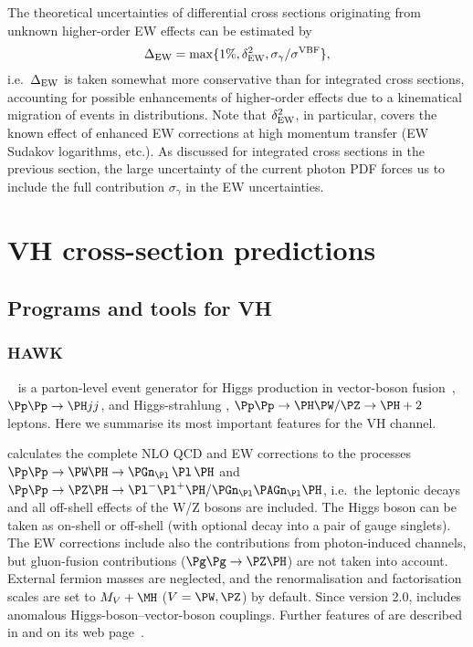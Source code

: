 The theoretical uncertainties of differential cross sections originating from unknown 
higher-order EW effects can be estimated by
\begin{equation}
\Delta_{\mathrm{EW}} = \max\{1\%,\delta_{\mathrm{EW}}^2,\sigma_\gamma/\sigma^{\mathrm{VBF}}\},
\end{equation}
i.e.\ $\Delta_{\mathrm{EW}}$ is taken somewhat more conservative than for integrated cross sections, accounting for possible
enhancements of higher-order effects due to a kinematical migration of events in distributions.
Note that $\delta_{\mathrm{EW}}^2$, in particular, covers the known effect of enhanced EW corrections at high
momentum transfer (EW Sudakov logarithms, etc.).
As discussed for integrated cross sections in the previous section, the large uncertainty of the
current photon PDF forces us to include the full contribution $\sigma_\gamma$ in the EW
uncertainties.

\clearpage

\section{VH cross-section predictions}
\label{sec:VH-XS}

\subsection{Programs and tools for VH}

\subsubsection{HAWK}
\label{sec:HAWK-VH-sub-sub}

\HAWK{}~\cite{Denner:2014cla,HAWK} 
is a parton-level event generator for Higgs production in
vector-boson fusion~\cite{Ciccolini:2007jr, Ciccolini:2007ec},
$\Pp\Pp\to\PH jj$, and Higgs-strahlung \cite{Denner:2011id},
$\Pp\Pp\to\PH\PW/\PZ\to \PH+2\,$leptons.
Here we summarise its most important features for the VH channel. 

\HAWK{} calculates the complete NLO QCD and EW corrections 
to the processes
$\Pp\Pp\to\PW\PH\to\PGn_{\Pl}\,\Pl\,\PH$ and
$\Pp\Pp\to\PZ\PH\to\Pl^-\Pl^+\PH/\PGn_{\Pl}\PAGn_{\Pl}\PH$,
i.e.\ the leptonic decays and all off-shell effects
of the W/Z bosons are included.
The Higgs boson can be taken as on-shell or off-shell
(with optional decay into a pair of gauge singlets).
The EW corrections include also the contributions from photon-induced
channels, but gluon-fusion contributions ($\Pg\Pg\to\PZ\PH$)
are not taken into account.
External fermion masses are neglected,
and the renormalisation and factorisation scales are set to $M_V+\MH$ 
($V=\PW,\PZ$) by default. Since version 2.0, \HAWK{} includes
anomalous Higgs-boson--vector-boson couplings.
Further features of \HAWK{} are described in 
and on its web page~\cite{HAWK}.

